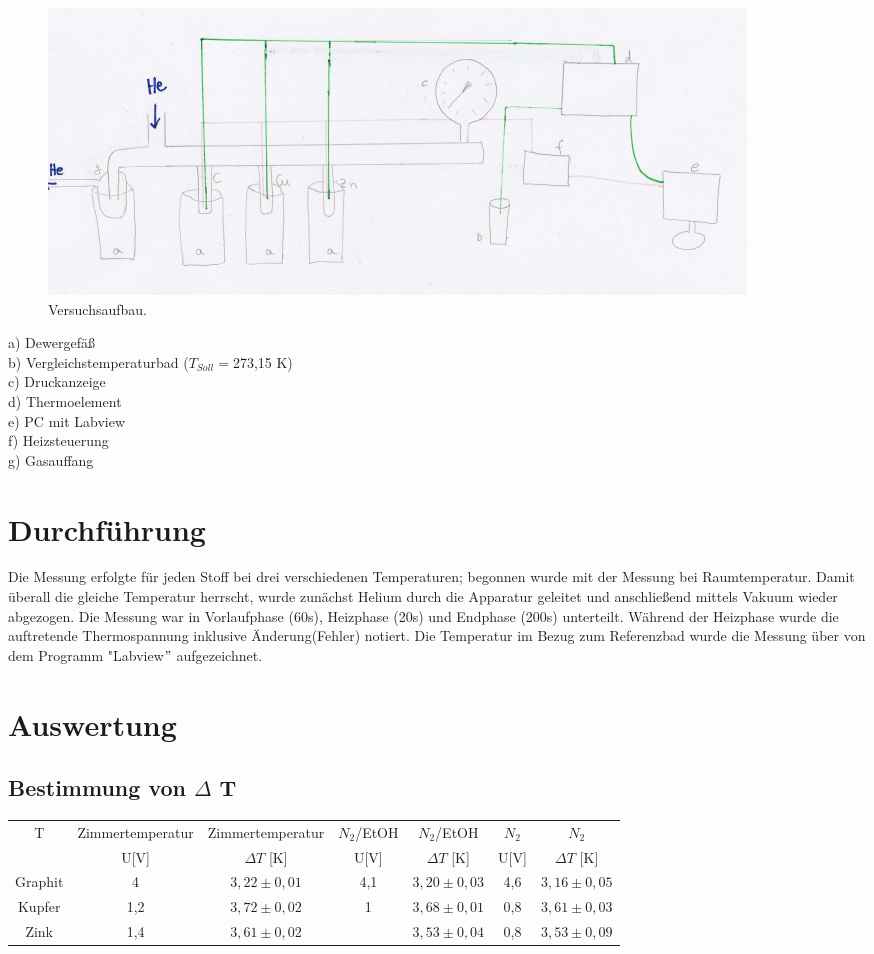 \documentclass[12pt,a4paper,titlepage,headinclude,bibtotoc]{scrartcl}
\begin{document}
\begin{figure} [h!]
\begin{center}
\includegraphics[scale=0.9]{VersuchsaufbauZeichnung.png} \end{center}
\caption{Versuchsaufbau.}
\end{figure}

a) Dewergefäß\\
b) Vergleichstemperaturbad ($T_{Soll}=$273,15 K)\\
c) Druckanzeige\\
d) Thermoelement\\
e) PC mit Labview\\
f) Heizsteuerung\\
g) Gasauffang\\
\section{Durchführung}
Die Messung erfolgte für jeden Stoff bei drei verschiedenen Temperaturen; begonnen wurde mit der Messung bei Raumtemperatur. Damit überall die gleiche Temperatur herrscht, wurde zunächst Helium durch die Apparatur geleitet und anschließend mittels Vakuum wieder abgezogen. Die Messung war in Vorlaufphase (60s), Heizphase (20s) und Endphase (200s) unterteilt. Während der Heizphase wurde die auftretende Thermospannung inklusive Änderung(Fehler) notiert. Die Temperatur im Bezug zum Referenzbad wurde die Messung über von dem Programm "Labview$"$ aufgezeichnet.\\



\section{Auswertung}

\subsection{Bestimmung von $\Delta$ T}
\begin{tabular}{c|c|c|c|c|c|c}
T & Zimmertemperatur &Zimmertemperatur& $N_2$/EtOH& $N_2$/EtOH& $N_2$& $N_2$\\ 
& U[V]& $\Delta T$ [K]&U[V]& $\Delta T$ [K]&U[V]& $\Delta T$ [K]\\
\hline
Graphit & 4 & $3,22\pm0,01$ & 4,1 &$3,20\pm0,03$&4,6&$3,16\pm0,05$\\  
Kupfer & 1,2 & $3,72\pm0,02$ & 1 &$3,68\pm 0,01$&0,8&$3,61\pm0,03$\\ 
Zink & 1,4 & $3,61\pm 0,02$ & &$3,53\pm0,04$&0,8&$3,53\pm 0,09$ \\ 
\end{tabular} 
\end{document}
